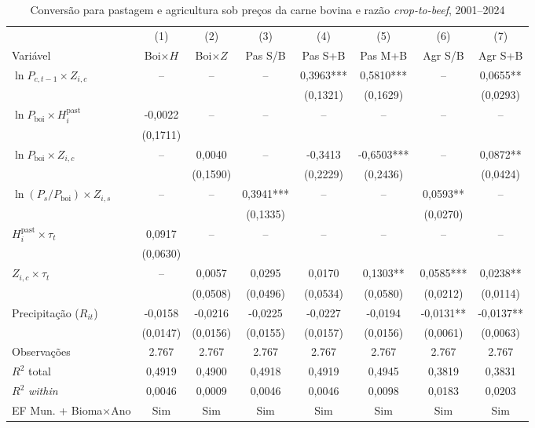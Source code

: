 \begin{table}[htbp]
\centering
\footnotesize
\setlength{\tabcolsep}{2.0pt}
\captionstyle{\centering}
\normalcaption
\caption{Conversão para pastagem e agricultura sob preços da carne bovina e razão \textit{crop-to-beef}, 2001--2024}
\label{tab:ap-pecuaria}
\begin{tabular}{lccccccc}
\toprule
 & (1) & (2) & (3) & (4) & (5) & (6) & (7) \\
Variável & Boi$\times H$ & Boi$\times Z$ & Pas S/B & Pas S+B & Pas M+B & Agr S/B & Agr S+B \\
\midrule
$\ln P_{c,t-1} \times Z_{i,c}$ & -- & -- & -- & 0,3963*** & 0,5810*** & -- & 0,0655** \\
 &  &  &  & (0,1321) & (0,1629) &  & (0,0293) \\
$\ln P_{\text{boi}} \times H_i^{\text{past}}$ & -0,0022 & -- & -- & -- & -- & -- & -- \\
 & (0,1711) &  &  &  &  &  &  \\
$\ln P_{\text{boi}} \times Z_{i,c}$ & -- & 0,0040 & -- & -0,3413 & -0,6503*** & -- & 0,0872** \\
 &  & (0,1590) &  & (0,2229) & (0,2436) &  & (0,0424) \\
$\ln(P_{s}/P_{\text{boi}}) \times Z_{i,s}$ & -- & -- & 0,3941*** & -- & -- & 0,0593** & -- \\
 &  &  & (0,1335) &  &  & (0,0270) &  \\
$H_i^{\text{past}} \times \tau_t$ & 0,0917 & -- & -- & -- & -- & -- & -- \\
 & (0,0630) &  &  &  &  &  &  \\
$Z_{i,c} \times \tau_t$ & -- & 0,0057 & 0,0295 & 0,0170 & 0,1303** & 0,0585*** & 0,0238** \\
 &  & (0,0508) & (0,0496) & (0,0534) & (0,0580) & (0,0212) & (0,0114) \\
Precipitação ($R_{it}$) & -0,0158 & -0,0216 & -0,0225 & -0,0227 & -0,0194 & -0,0131** & -0,0137** \\
 & (0,0147) & (0,0156) & (0,0155) & (0,0157) & (0,0156) & (0,0061) & (0,0063) \\
\midrule
Observações & 2.767 & 2.767 & 2.767 & 2.767 & 2.767 & 2.767 & 2.767 \\
$R^2$ total & 0,4919 & 0,4900 & 0,4918 & 0,4919 & 0,4945 & 0,3819 & 0,3831 \\
$R^2$ \textit{within} & 0,0046 & 0,0009 & 0,0046 & 0,0046 & 0,0098 & 0,0183 & 0,0203 \\
EF Mun. + Bioma$\times$Ano & Sim & Sim & Sim & Sim & Sim & Sim & Sim \\

\end{tabular}
\end{table}
